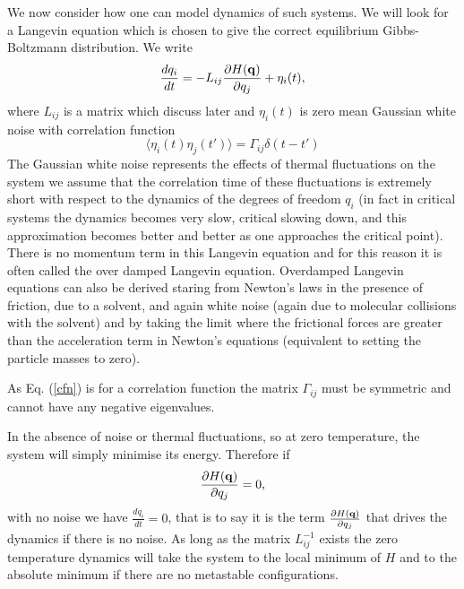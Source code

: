 We now consider how one can model dynamics of such systems. We will look for a Langevin equation which is chosen to give the correct equilibrium Gibbs-Boltzmann distribution. We write
\begin{equation}
\frac{d q_i}{dt} = -L_{ij}\frac{\partial H({\bf q})}{ \partial q_j} + \eta_i(t),
\end{equation}
where $L_{ij}$ is a matrix which discuss later and $\eta_i(t)$ is zero mean Gaussian white noise  with correlation function 
\begin{equation}
\langle \eta_i(t)\eta_j(t')\rangle =  \Gamma_{ij} \delta(t-t')\label{cfn}
\end{equation}
The Gaussian white noise represents the effects of thermal fluctuations on the system we assume that the correlation time of these fluctuations is extremely short with respect to the dynamics of the degrees of freedom $q_i$ (in fact in critical systems the dynamics becomes very slow, critical slowing down, and this approximation becomes better and better as one approaches the critical point).  There is no momentum term in this Langevin equation and for this reason it is often called the over damped Langevin equation. Overdamped Langevin equations can also be derived staring from Newton's laws in the presence of friction, due to a solvent, and again white noise (again due to molecular collisions with the solvent) and by taking the limit where the frictional forces are greater than the acceleration term in Newton's equations (equivalent to setting the particle masses to zero).


As Eq. (\ref{cfn}) is for a correlation function the matrix $\Gamma_{ij}$ must be symmetric and cannot have any negative eigenvalues.

In the absence of noise or thermal fluctuations, so at zero temperature, the system will simply minimise its energy. Therefore if 
\begin{equation}
\frac{\partial H({\bf q})}{ \partial q_j} =0, 
\end{equation}
with no noise we have $\frac{d q_i}{dt}=0$, that is to say it is the term $\frac{\partial H({\bf q})}{ \partial q_j}$ that drives the dynamics if there is no noise. As long as the matrix $L_{ij}^{-1}$ exists the zero temperature dynamics will take the system to the local minimum of $H$ and to the absolute minimum if there are no metastable configurations. 


